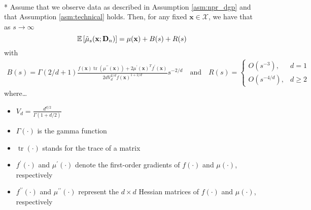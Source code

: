 \begin{boxD}
	\begin{thm}\label{thm:dem1}\mbox{}\\*
		Assume that we observe data as described in Assumption \ref{asm:npr_dgp} and that Assumption \ref{asm:technical} holds.
		Then, for any fixed $\mathbf{x} \in \mathcal{X}$, we have that as $s \rightarrow \infty$
		\begin{equation}
			\mathbb{E}\left[\tilde{\mu}_{s}(\mathbf{x}; \mathbf{D}_n)\right] 
			= \mu(\mathbf{x}) + B(s) + R(s)
		\end{equation}
		with
		\begin{align}
			B(s) =\Gamma(2 / d+1) \frac{f(\mathbf{x}) \operatorname{tr}\left(\mu^{\prime \prime}(\mathbf{x})\right)+2 \mu^{\prime}(\mathbf{x})^T f^{\prime}(\mathbf{x})}{2 d V_d^{2 / d} f(\mathbf{x})^{1+2 / d}} s^{-2 / d}
			\quad \text{and} \quad
			R(s) = \begin{cases}O\left(s^{-3}\right),     & d=1      \\
				 O\left(s^{-4 / d}\right), & d \geq 2\end{cases}
		\end{align}
		where\dots
		\begin{multicols}{2}
			\begin{itemize}
				\item $V_d=\frac{d^{d / 2}}{\Gamma(1+d / 2)}$
				\item $\Gamma(\cdot)$ is the gamma function
				\item $\operatorname{tr}(\cdot)$ stands for the trace of a matrix
				\item $f^{\prime}(\cdot)$ and $\mu^{\prime}(\cdot)$ denote the first-order gradients of $f(\cdot)$ and $\mu(\cdot)$, respectively
				\item $f^{\prime \prime}(\cdot)$ and $\mu^{\prime \prime}(\cdot)$ represent the $d \times d$ Hessian matrices of $f(\cdot)$ and $\mu(\cdot)$, respectively
			\end{itemize}
		\end{multicols}
	\end{thm}
\end{boxD}

